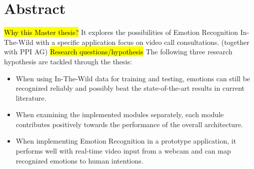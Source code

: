\documentclass[11pt,a4paper]{scrbook}
\begin{document}
\begin{titlepage}
\end{titlepage}

\restoregeometry



\chapter{Abstract}
\hl{Why this Master thesis?}\newline
It explores the possibilities of Emotion Recognition In-The-Wild with a specific application focus on video call consultations. (together with PPI AG)
\newline\newline
\hl{Research questions/hypothesis}\newline
The following three research hypothesis are tackled through the thesis:\newline
\begin{itemize}
    \item When using In-The-Wild data for training and testing, emotions can still be recognized reliably and possibly beat the state-of-the-art results in current literature.
    \item When examining the implemented modules separately, each module contributes positively towards the performance of the overall architecture.
    \item When implementing Emotion Recognition in a prototype application, it performs well with real-time video input from a webcam and can map recognized emotions to human intentions.
\end{itemize}
\end{document}
